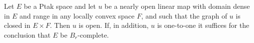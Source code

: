 Let $E$ be a Ptak space and let $u$ be a nearly open linear map with domain dense in $E$ and range in any locally convex space $F$, and such that the graph of $u$ is closed in $E \times F$. Then $u$ is open. If, in addition, $u$ is one-to-one it suffices for the conclusion that $E$ be $B_r$-complete.